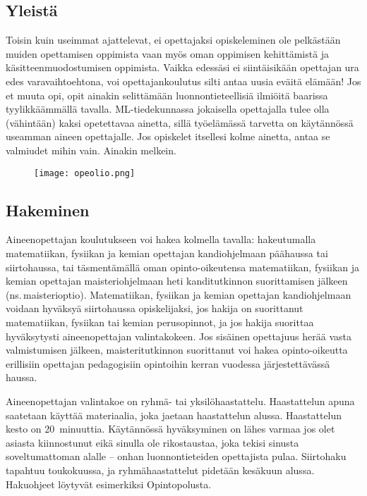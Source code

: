 \documentclass[../ala_hataile.tex]{subfiles}
\begin{document}
\clearpage

\raggedbottom
{}
\subsection*{Yleistä}
Toisin kuin useimmat ajattelevat, ei
opettajaksi opiskeleminen ole pelkästään
muiden opettamisen oppimista vaan myös
oman oppimisen kehittämistä ja käsitteen\-muodostumisen
oppimista. Vaikka edessäsi
ei siintäisikään opettajan ura edes vara\-vaihto\-ehtona,
voi opettajan\-koulutus silti
antaa uusia eväitä elämään! Jos et muuta
opi, opit ainakin selittämään luonnon\-tieteellisiä
ilmiöitä baarissa tyylikkäämmällä
tavalla. ML-tiedekunnassa jokaisella opettajalla
tulee olla (vähintään) kaksi opetettavaa
ainetta, sillä työelämässä tarvetta on
käytännössä useamman aineen opettajalle.
Jos opiskelet itsellesi kolme ainetta, antaa
se valmiudet mihin vain. Ainakin melkein.
\begin{figure}[!b]
	\texttt{[image: opeolio.png]}
\end{figure}
\subsection*{Hakeminen}
Aineenopettajan koulutukseen voi hakea
kolmella tavalla: hakeutumalla matematiikan, fysiikan
ja kemian opettajan kandi\-ohjelmaan päähaussa tai siirto\-haussa, tai täsmentämällä oman opinto-oikeutensa matematiikan, fysiikan ja kemian opettajan maisteri\-ohjelmaan heti kandi\-tutkinnon suorittamisen jälkeen (ns.\,maisterioptio). Matematiikan, fysiikan ja kemian opettajan kandiohjelmaan voidaan hyväksyä siirto\-haussa opiskelijaksi, jos hakija on suorittanut matematiikan, fysiikan tai kemian perusopinnot, ja jos hakija suorittaa hyväksytysti aineen\-opettajan valintakokeen. Jos sisäinen opettajuus herää vasta valmistumisen jälkeen, maisteri\-tutkinnon suorittanut voi hakea opinto-oikeutta erillisiin opettajan pedagogisiin opintoihin kerran vuodessa järjestettävässä haussa.

Aineenopettajan valintakoe on ryhmä- tai yksilö\-haastattelu. Haastattelun apuna saatetaan käyttää materiaalia, joka jaetaan haastattelun alussa. Haastattelun kesto on 20~minuuttia. Käytännössä hyväksyminen on lähes varmaa jos olet asiasta
kiinnostunut eikä sinulla ole rikos\-taustaa, joka tekisi sinusta soveltumattoman alalle -- onhan luonnon\-tieteiden
opettajista pulaa. Siirtohaku tapahtuu toukokuussa, ja ryhmä\-haastattelut pidetään kesäkuun alussa. Hakuohjeet löytyvät esimerkiksi Opinto\-polusta.
\end{document}
